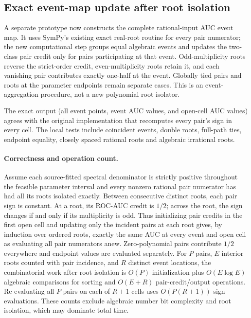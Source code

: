 \subsection{Exact event-map update after root isolation}
\label{sec:p4-incremental-events}
A separate prototype now constructs the complete rational-input
AUC event map. It uses SymPy's existing exact real-root routine
for every pair numerator; the new computational step groups equal
algebraic events and updates the two-class pair credit only for
pairs participating at that event. Odd-multiplicity roots reverse
the strict-order credit, even-multiplicity roots retain it, and
each vanishing pair contributes exactly one-half at the event.
Globally tied pairs and roots at the parameter endpoints remain
separate cases. This is an event-aggregation procedure, not a
new polynomial root isolator.

The exact output (all event points, event AUC values, and open-cell
AUC values) agrees with the original implementation that recomputes
every pair's sign in every cell. The local tests include coincident events, double roots, full-path ties, endpoint equality,
closely spaced rational roots and algebraic irrational roots.
\paragraph{Correctness and operation count.}
Assume each source-fitted spectral denominator is strictly positive
throughout the feasible parameter interval and every nonzero rational
pair numerator has had all its roots isolated exactly. Between
consecutive distinct roots, each pair sign is constant. At a root,
its ROC-AUC credit is $1/2$; across the root, the sign changes if
and only if its multiplicity is odd. Thus initializing pair credits
in the first open cell and updating only the incident pairs at each
root gives, by induction over ordered roots, exactly the same AUC
at every event and open cell as evaluating all pair numerators
anew. Zero-polynomial pairs contribute $1/2$ everywhere and
endpoint values are evaluated separately. For $P$ pairs, $E$
interior roots counted with pair incidence, and $R$ distinct event
locations, the combinatorial work after root isolation is $O(P)$
initialization plus $O(E\log E)$ algebraic comparisons for sorting
and $O(E+R)$ pair-credit/output operations. Re-evaluating all
$P$ pairs on each of $R+1$ cells uses $O(P(R+1))$ sign evaluations.
These counts exclude algebraic number bit complexity and root
isolation, which may dominate total time.

